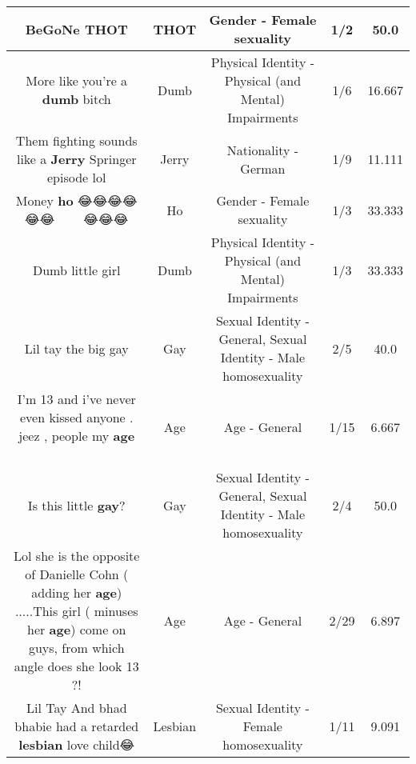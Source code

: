 \documentclass[11pt]{article}
\newlength\mylength
\begin{document}
\begin{center}
\begin{longtable}{|C{.65\mylength}|C{.30\mylength}|C{.12\mylength}|C{.12\mylength}|C{.12\mylength}|}
  \small BeGoNe THOT\normalsize   & THOT & Gender - Female sexuality & 1/2 & 50.0 \\  \hline
  \small More like you're a \textbf{dumb} bitch\normalsize   & Dumb & Physical Identity - Physical (and Mental) Impairments & 1/6 & 16.667 \\  \hline
  \small Them fighting sounds like a \textbf{Jerry} Springer episode lol\normalsize   & Jerry & Nationality - German & 1/9 & 11.111 \\  \hline
  \small Money \textbf{ho} 😂😂😂😂😂😂🍆🍆🍆🍆🍆💕💕💕😂😂😂\normalsize   & Ho & Gender - Female sexuality & 1/3 & 33.333 \\  \hline
  \small Dumb little girl\normalsize   & Dumb & Physical Identity - Physical (and Mental) Impairments & 1/3 & 33.333 \\  \hline
  \small Lil tay the big gay\normalsize   & Gay & Sexual Identity - General, Sexual Identity - Male homosexuality & 2/5 & 40.0 \\  \hline
  \small I'm 13 and i've never even kissed anyone . jeez , people my \textbf{age} 🤦🏼‍♀️\normalsize   & Age & Age - General & 1/15 & 6.667 \\  \hline
  \small Is this little \textbf{g\textbf{ay}}?\normalsize   & Gay & Sexual Identity - General, Sexual Identity - Male homosexuality & 2/4 & 50.0 \\  \hline
  \small Lol she is the opposite of Danielle Cohn ( adding her \textbf{age}) .....This girl ( minuses her \textbf{age}) come on guys, from which angle does she look 13 ?!\normalsize   & Age & Age - General & 2/29 & 6.897 \\  \hline
  \small Lil Tay And bhad bhabie had a retarded \textbf{lesbian} love child😂\normalsize   & Lesbian & Sexual Identity - Female homosexuality & 1/11 & 9.091 \\  \hline

\end{longtable}
\end{center}
\end{document}
